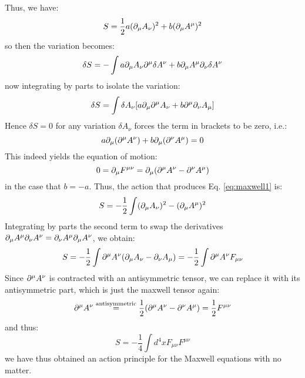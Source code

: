 Thus, we have:
\begin{equation}
    S = \frac{1}{2}a(\partial_\mu A_\nu)^2 + b(\partial_\mu A^\mu)^2
\end{equation}
so then the variation becomes:
\begin{equation}
    \delta S = -\int a \partial_\mu A_\nu \partial^\mu \delta A^\nu + b \partial_\mu A^\mu \partial_\nu \delta A^\nu
\end{equation}
now integrating by parts to isolate the variation:
\begin{equation}
    \delta S = \int \delta A_\nu [a\partial_\mu \partial^\mu A_\nu + b\partial^\mu \partial_\nu A_\mu]
\end{equation}
Hence $\delta S = 0$ for any variation $\delta A_\nu$ forces the term in brackets to be zero, i.e.:
\begin{equation}
    a\partial_\mu(\partial^\mu A^\nu) + b\partial_\mu (\partial^\nu A^\mu) = 0
\end{equation}
This indeed yields the equation of motion:
\begin{equation}
    0 = \partial_\mu F^{\mu\nu} = \partial_\mu (\partial^\mu A^\nu - \partial^\nu A^\mu)
\end{equation}
in the case that $b = -a$. Thus, the action that produces Eq. \eqref{eq:maxwell1} is:
\begin{equation}
    S = -\frac{1}{2}\int (\partial_\mu A_\nu)^2 - (\partial_\mu A^\mu)^2
\end{equation}
Integrating by parts the second term to swap the derivatives $\partial_\mu A^\mu \partial_\nu A^\nu = \partial_\nu A^\mu \partial_\mu A^\nu$, we obtain:
\begin{equation}
    S = -\frac{1}{2}\int \partial^\mu A^\nu(\partial_\mu A_\nu - \partial_\nu A_\mu) = -\frac{1}{2}\int \partial^\mu A^\nu F_{\mu\nu}
\end{equation}
Since $\partial^\mu A^\nu$ is contracted with an antisymmetric tensor, we can replace it with its antisymmetric part, which is just the maxwell tensor again:
\begin{equation}
    \partial^\mu A^\nu \stackrel{\text{antisymmetric}}{=} \frac{1}{2}(\partial^\mu A^\nu - \partial^\nu A^\mu) = \frac{1}{2}F^{\mu\nu}
\end{equation}
and thus:
\begin{equation}
    S = -\frac{1}{4}\int d^4x F_{\mu\nu}F^{\mu\nu}
\end{equation}
we have thus obtained an action principle for the Maxwell equations with no matter.

